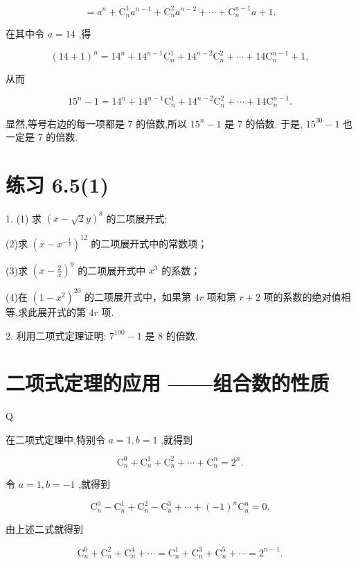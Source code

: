 \documentclass[10pt]{article}
\begin{document}
\[
= {a}^{n} + {\mathrm{C}}_{n}^{1}{a}^{n - 1} + {\mathrm{C}}_{n}^{2}{a}^{n - 2} + \cdots  + {\mathrm{C}}_{n}^{n - 1}a + 1.
\]

在其中令 \(a = {14}\) ,得

\[
{\left( {14} + 1\right) }^{n} = {14}^{n} + {14}^{n - 1}{\mathrm{C}}_{n}^{1} + {14}^{n - 2}{\mathrm{C}}_{n}^{2} + \cdots  + {14}{\mathrm{C}}_{n}^{n - 1} + 1,
\]

从而

\[
{15}^{n} - 1 = {14}^{n} + {14}^{n - 1}{\mathrm{C}}_{n}^{1} + {14}^{n - 2}{\mathrm{C}}_{n}^{2} + \cdots  + {14}{\mathrm{C}}_{n}^{n - 1}.
\]

显然,等号右边的每一项都是 7 的倍数,所以 \({15}^{n} - 1\) 是 7 的倍数. 于是, \({15}^{30} - 1\) 也一定是 7 的倍数.

\section*{练习 6.5(1)}

1. (1) 求 \({\left( x - \sqrt{2}y\right) }^{8}\) 的二项展开式;

(2)求 \({\left( x - {x}^{-\frac{1}{3}}\right) }^{12}\) 的二项展开式中的常数项；

(3)求 \({\left( x - \frac{2}{x}\right) }^{9}\) 的二项展开式中 \({x}^{3}\) 的系数；

(4)在 \({\left( 1 - {x}^{2}\right) }^{20}\) 的二项展开式中，如果第 \({4r}\) 项和第 \(r + 2\) 项的系数的绝对值相等,求此展开式的第 \({4r}\) 项.

2. 利用二项式定理证明: \({7}^{100} - 1\) 是 8 的倍数.

\section*{二项式定理的应用 ——组合数的性质}

Q

在二项式定理中,特别令 \(a = 1,b = 1\) ,就得到

\[
{\mathrm{C}}_{n}^{0} + {\mathrm{C}}_{n}^{1} + {\mathrm{C}}_{n}^{2} + \cdots  + {\mathrm{C}}_{n}^{n} = {2}^{n}.
\]

令 \(a = 1,b =  - 1\) ,就得到

\[
{\mathrm{C}}_{n}^{0} - {\mathrm{C}}_{n}^{1} + {\mathrm{C}}_{n}^{2} - {\mathrm{C}}_{n}^{3} + \cdots  + {\left( -1\right) }^{n}{\mathrm{C}}_{n}^{n} = 0.
\]

由上述二式就得到

\[
{\mathrm{C}}_{n}^{0} + {\mathrm{C}}_{n}^{2} + {\mathrm{C}}_{n}^{4} + \cdots  = {\mathrm{C}}_{n}^{1} + {\mathrm{C}}_{n}^{3} + {\mathrm{C}}_{n}^{5} + \cdots  = {2}^{n - 1}.
\]
\end{document}
